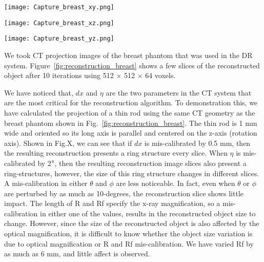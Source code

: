 \begin{figure*}
	\begin{minipage}{0.3\linewidth}
		\texttt{[image: Capture\_breast\_xy.png]}
		\subcaption{}
	\end{minipage}
	\vspace{0.3cm}
	\begin{minipage}{0.3\linewidth}
		\texttt{[image: Capture\_breast\_xz.png]}
		\subcaption{}
	\end{minipage}
	\vspace{0.3cm}
	\begin{minipage}{0.3\linewidth}
		\texttt{[image: Capture\_breast\_yz.png]}
		\subcaption{}
	\end{minipage}
\caption{The reconstructed breast phantom using 512 $\times$ 512 $\times$ 64 voxels after 10 iterations.  A slice of the phantom in the (a) x-y plane (b) x-z plane, and (c) y-z plane.}
\label{fig:reconstruction_breast}
\end{figure*}

We took CT projection images of the breast phantom that was used in the DR system.  Figure~\ref{fig:reconstruction_breast} shows a few slices of the reconstructed object after 10 iterations using 512 $\times$ 512 $\times$ 64 voxels.  

We have noticed that, $dx$ and $\eta$ are the two parameters in the CT system that are the most critical for the reconstruction algorithm.  To demonstration this, we have calculated the projection of a thin rod using the same CT geometry as the breast phantom shown in Fig.~\ref{fig:reconstruction_breast}.  The thin rod is 1 mm wide and oriented so its long axis is parallel and centered on the z-axis (rotation axis).  Shown in Fig.X, we can see that if $dx$ is mis-calibrated by 0.5 mm, then the resulting reconstruction presents a ring structure every slice.  When $\eta$ is mis-calibrated by 2$\degree$, then the resulting reconstruction image slices also present a ring-structures, however, the size of this ring structure changes in different slices.  A mis-calibration in either $\theta$ and $\phi$ are less noticeable.  In fact, even when $\theta$ or $\phi$ are perturbed by as much as 10-degrees, the reconstruction slice shows little impact.  The length of R and Rf specify the x-ray magnification, so a mis-calibration in either one of the values, results in the reconstructed object size to change.  However, since the size of the reconstructed object is also affected by the optical magnification, it is difficult to know whether the object size variation is due to optical magnification or R and Rf mis-calibration.  We have varied Rf by as much as 6 mm, and little affect is observed.

